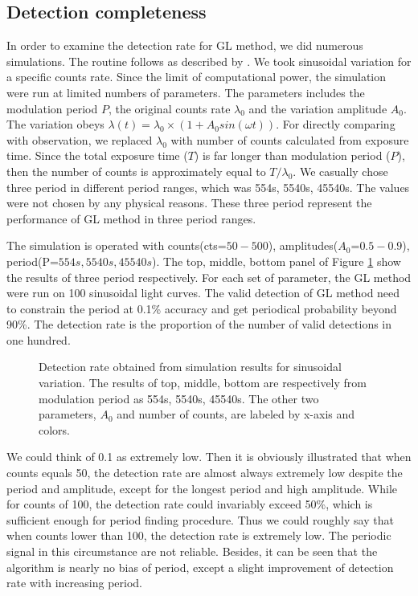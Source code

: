 \documentclass[twoside,twocolumn]{aastex63}
\begin{document}
\subsection{Detection completeness}\label{subsec:simulation}
In order to examine the detection rate for GL method, we did numerous simulations. The routine follows as described by \citep{1998ApJ...498..666C}. We took sinusoidal variation for a specific counts rate. Since the limit of computational power, the simulation were run at limited numbers of parameters. The parameters includes the modulation period $P$, the original counts rate $\lambda_0$ and the variation amplitude $A_0$. The variation obeys $\lambda (t)=\lambda_0 \times (1+A_{0}sin(\omega t))$. For directly comparing with observation, we replaced $\lambda_0$ with number of counts calculated from exposure time. Since the total exposure time ($T$) is far longer than modulation period ($P$), then the number of counts is approximately equal to $T/\lambda_0$. We casually chose three period in different period ranges, which was 554s, 5540s, 45540s. The values were not chosen by any physical reasons. These three period represent the performance of GL method in three period ranges. 

The simulation is operated with counts(cts=$50-500$), amplitudes($A_0$=$0.5-0.9$), period(P=$554s,5540s,45540s$). The top, middle, bottom panel of Figure \ref{fig:detection} show the results of three period respectively. For each set of parameter, the GL method were run on 100 sinusoidal light curves.
The valid detection of GL method need to constrain the period at 0.1\% accuracy and get periodical  probability beyond 90\%.
The detection rate is the proportion of the number of valid detections in one hundred.

\begin{figure}[htbp]
\caption{Detection rate obtained from simulation results for sinusoidal variation. The results of top, middle, bottom are respectively from modulation period as 554s, 5540s, 45540s. The other two parameters, $A_{0}$ and number of counts, are labeled by x-axis and colors. \label{fig:detection}}
\end{figure}
We could think of 0.1 as extremely low. Then it is obviously illustrated that when counts equals 50, the detection rate are almost always extremely low despite the period and amplitude, except for the longest period and high amplitude. While for counts of 100, the detection rate could invariably exceed 50\%, which is sufficient enough for period finding procedure. Thus we could roughly say that when counts lower than 100, the detection rate is extremely low. The periodic signal in this circumstance are not reliable. Besides, it can be seen that the algorithm is nearly no bias of period, except a slight improvement of detection rate with increasing period.
 
\end{document}
